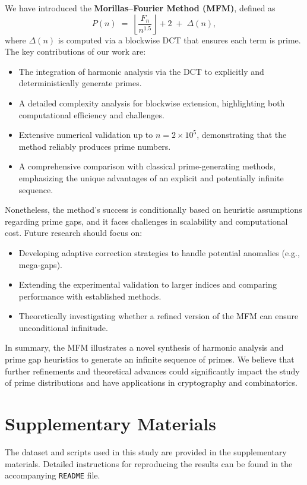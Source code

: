 \documentclass[12pt]{article}
\begin{document}
We have introduced the \textbf{Morillas--Fourier Method (MFM)}, defined as
\[
  P(n) \;=\; \left\lfloor \frac{F_n}{n^{1.5}} \right\rfloor + 2 \;+\; \Delta(n),
\]
where $\Delta(n)$ is computed via a blockwise DCT that ensures each term is prime. The key contributions of our work are:
\begin{itemize}
    \item The integration of harmonic analysis via the DCT to explicitly and deterministically generate primes.
    \item A detailed complexity analysis for blockwise extension, highlighting both computational efficiency and challenges.
    \item Extensive numerical validation up to $n=2\times10^5$, demonstrating that the method reliably produces prime numbers.
    \item A comprehensive comparison with classical prime-generating methods, emphasizing the unique advantages of an explicit and potentially infinite sequence.
\end{itemize}

Nonetheless, the method's success is conditionally based on heuristic assumptions regarding prime gaps, and it faces challenges in scalability and computational cost. Future research should focus on:
\begin{itemize}
    \item Developing adaptive correction strategies to handle potential anomalies (e.g., mega-gaps).
    \item Extending the experimental validation to larger indices and comparing performance with established methods.
    \item Theoretically investigating whether a refined version of the MFM can ensure unconditional infinitude.
\end{itemize}

In summary, the MFM illustrates a novel synthesis of harmonic analysis and prime gap heuristics to generate an infinite sequence of primes. We believe that further refinements and theoretical advances could significantly impact the study of prime distributions and have applications in cryptography and combinatorics.

\section*{Supplementary Materials}
The dataset and scripts used in this study are provided in the supplementary materials. Detailed instructions for reproducing the results can be found in the accompanying \texttt{README} file.
\end{document}
